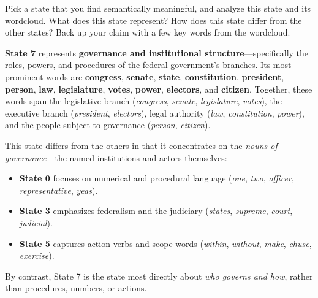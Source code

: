 \documentclass{article}
\begin{document}
\indent\problem[5] %
Pick a state that you find semantically meaningful, and analyze this state and its wordcloud. What does this state represent? How does this state differ from the other states? Back up your claim with a few key words from the wordcloud.
\begin{subsolution}

\textbf{State 7} represents \textbf{governance and institutional structure}---specifically the roles, powers, and procedures of the federal government's branches. Its most prominent words are \textbf{congress}, \textbf{senate}, \textbf{state}, \textbf{constitution}, \textbf{president}, \textbf{person}, \textbf{law}, \textbf{legislature}, \textbf{votes}, \textbf{power}, \textbf{electors}, and \textbf{citizen}. Together, these words span the legislative branch (\emph{congress}, \emph{senate}, \emph{legislature}, \emph{votes}), the executive branch (\emph{president}, \emph{electors}), legal authority (\emph{law}, \emph{constitution}, \emph{power}), and the people subject to governance (\emph{person}, \emph{citizen}).

This state differs from the others in that it concentrates on the \emph{nouns of governance}---the named institutions and actors themselves:
\begin{itemize}
    \item \textbf{State 0} focuses on numerical and procedural language (\emph{one}, \emph{two}, \emph{officer}, \emph{representative}, \emph{yeas}).
    \item \textbf{State 3} emphasizes federalism and the judiciary (\emph{states}, \emph{supreme}, \emph{court}, \emph{judicial}).
    \item \textbf{State 5} captures action verbs and scope words (\emph{within}, \emph{without}, \emph{make}, \emph{chuse}, \emph{exercise}).
\end{itemize}
By contrast, State 7 is the state most directly about \emph{who governs and how}, rather than procedures, numbers, or actions.

\end{subsolution}
\newpage
\end{document}
